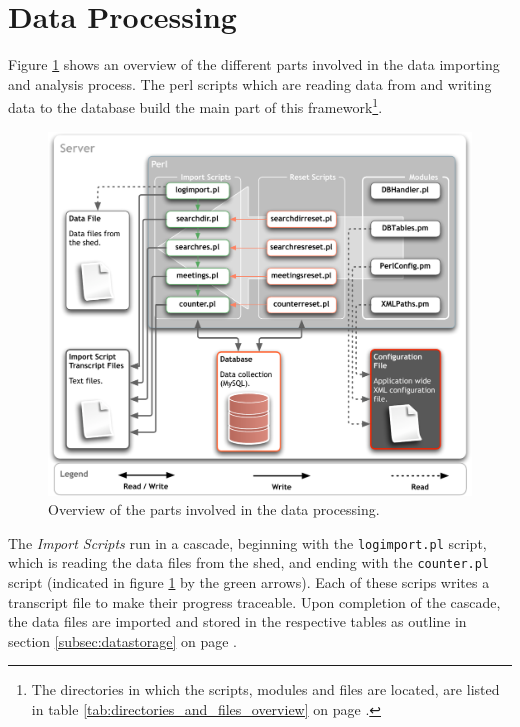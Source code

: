 \newpage
\section{Data Processing}
\label{sec:dataproc}

Figure \ref{fig:app_design_perl} shows an overview of the different parts involved in the data importing and analysis process. The \ac{perl} scripts which are reading data from and writing data to the database build the main part of this framework\footnote{The directories in which the scripts, modules and files are located, are listed in table \ref{tab:directories_and_files_overview} on page \pageref{tab:directories_and_files_overview}.}.

\begin{figure}[htpb]
\begin{center}
  \includegraphics[width=\textwidth]{assets/pdf/app_design_perl.pdf}
  \caption[Data processing overview]{Overview of the parts involved in the data processing.}
  \label{fig:app_design_perl}
\end{center}
\end{figure}

The \textit{Import Scripts} run in a cascade, beginning with the \lstinline|logimport.pl| script, which is reading the data files from the shed, and ending with the \lstinline|counter.pl| script (indicated in figure \ref{fig:app_design_perl} by the green arrows). Each of these scrips writes a transcript file to make their progress traceable. Upon completion of the cascade, the data files are imported and stored in the respective tables as outline in section \ref{subsec:datastorage} on page \pageref{subsec:datastorage}.

